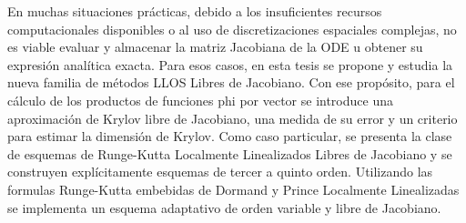 En muchas situaciones prácticas, debido a los insuficientes recursos computacionales disponibles o al uso de discretizaciones espaciales complejas, no es viable evaluar y almacenar la matriz Jacobiana de la ODE u obtener su expresión analítica exacta. Para esos casos, en esta tesis se propone y estudia la nueva familia de métodos LLOS Libres de Jacobiano. Con ese propósito, para el cálculo de los productos de funciones phi por vector se introduce una aproximación de Krylov libre de Jacobiano, una medida de su error y un criterio para estimar la dimensión de Krylov. Como caso particular, se presenta la clase de esquemas de Runge-Kutta Localmente Linealizados Libres de Jacobiano y se construyen explícitamente esquemas de tercer a quinto orden. Utilizando las  formulas Runge-Kutta embebidas de Dormand y Prince Localmente Linealizadas se implementa un esquema adaptativo de orden variable y libre de Jacobiano.


